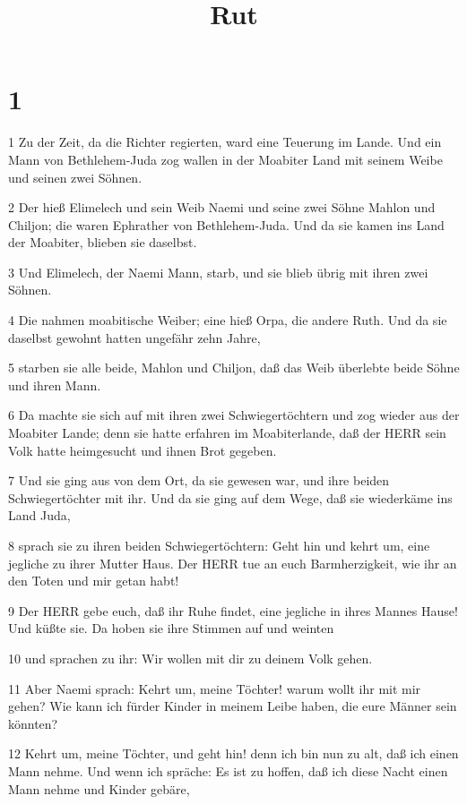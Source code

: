 

\title{Rut}


\chapter{1}

\par 1 Zu der Zeit, da die Richter regierten, ward eine Teuerung im Lande. Und ein Mann von Bethlehem-Juda zog wallen in der Moabiter Land mit seinem Weibe und seinen zwei Söhnen.
\par 2 Der hieß Elimelech und sein Weib Naemi und seine zwei Söhne Mahlon und Chiljon; die waren Ephrather von Bethlehem-Juda. Und da sie kamen ins Land der Moabiter, blieben sie daselbst.
\par 3 Und Elimelech, der Naemi Mann, starb, und sie blieb übrig mit ihren zwei Söhnen.
\par 4 Die nahmen moabitische Weiber; eine hieß Orpa, die andere Ruth. Und da sie daselbst gewohnt hatten ungefähr zehn Jahre,
\par 5 starben sie alle beide, Mahlon und Chiljon, daß das Weib überlebte beide Söhne und ihren Mann.
\par 6 Da machte sie sich auf mit ihren zwei Schwiegertöchtern und zog wieder aus der Moabiter Lande; denn sie hatte erfahren im Moabiterlande, daß der HERR sein Volk hatte heimgesucht und ihnen Brot gegeben.
\par 7 Und sie ging aus von dem Ort, da sie gewesen war, und ihre beiden Schwiegertöchter mit ihr. Und da sie ging auf dem Wege, daß sie wiederkäme ins Land Juda,
\par 8 sprach sie zu ihren beiden Schwiegertöchtern: Geht hin und kehrt um, eine jegliche zu ihrer Mutter Haus. Der HERR tue an euch Barmherzigkeit, wie ihr an den Toten und mir getan habt!
\par 9 Der HERR gebe euch, daß ihr Ruhe findet, eine jegliche in ihres Mannes Hause! Und küßte sie. Da hoben sie ihre Stimmen auf und weinten
\par 10 und sprachen zu ihr: Wir wollen mit dir zu deinem Volk gehen.
\par 11 Aber Naemi sprach: Kehrt um, meine Töchter! warum wollt ihr mit mir gehen? Wie kann ich fürder Kinder in meinem Leibe haben, die eure Männer sein könnten?
\par 12 Kehrt um, meine Töchter, und geht hin! denn ich bin nun zu alt, daß ich einen Mann nehme. Und wenn ich spräche: Es ist zu hoffen, daß ich diese Nacht einen Mann nehme und Kinder gebäre,
